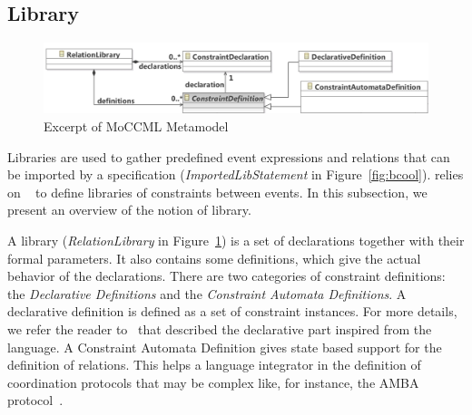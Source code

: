 \subsection{Library}
\label{subsec:bcoollib}

\begin{figure}
	\center
	\includegraphics[width=.8\textwidth]{bcool/figs/moccmlmm}
	\caption{Excerpt of MoCCML Metamodel}
	\label{fig:moccml}
\end{figure}

Libraries are used to gather predefined event expressions and relations that can be imported by a \bcool specification (\emph{ImportedLibStatement} in Figure~\ref{fig:bcool}). \bcool relies on \moccml~\cite{moccmlbib} to define libraries of constraints between events. In this subsection, we present an overview of the notion of \moccml library.

A \moccml library (\emph{RelationLibrary} in Figure~\ref{fig:moccml}) is a set of declarations together with their formal parameters. It also contains some definitions, which give the actual behavior of the declarations. There are two categories of constraint definitions: the \emph{Declarative Definitions} and the \emph{Constraint Automata Definitions}. A declarative definition is defined as a set of constraint instances. For more details, we refer the reader to~\cite{moccmloperbib} that described the declarative part inspired from the \ccsl language. A Constraint Automata Definition gives state based support for the definition of relations. This helps a language integrator in the definition of coordination protocols that may be complex like, for instance, the AMBA protocol~\cite{ambabus}. 


